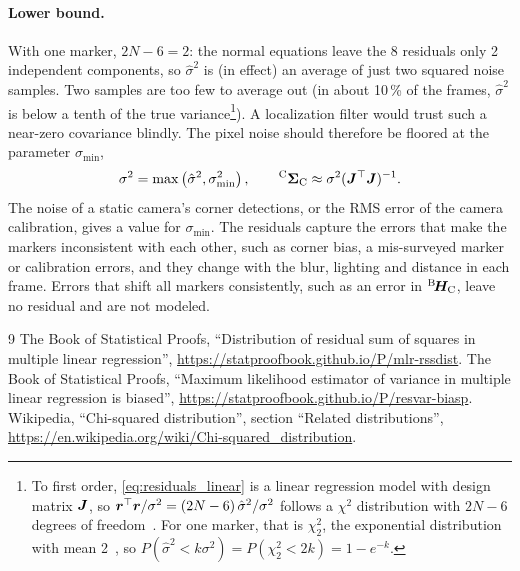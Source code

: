 \documentclass{article}
\begin{document}
\paragraph{Lower bound.}
With one marker, $2N - 6 = 2$: the normal equations leave the 8 residuals only 2 independent components, so $\hat\sigma^2$ is (in effect) an average of just two squared noise samples. Two samples are too few to average out (in about 10\,\% of the frames, $\hat\sigma^2$ is below a tenth of the true variance\footnote{To first order, \eqref{eq:residuals_linear} is a linear regression model with design matrix $\bm{J}$, so $\bm{r}^\top \bm{r} / \sigma^2 = (2N - 6)\,\hat\sigma^2 / \sigma^2$ follows a $\chi^2$ distribution with $2N - 6$ degrees of freedom~\cite{statproofbook_rssdist}. For one marker, that is $\chi^2_2$, the exponential distribution with mean 2~\cite{wikipedia_chi2}, so $P(\hat\sigma^2 < k \sigma^2) = P(\chi^2_2 < 2k) = 1 - e^{-k}$.}). A localization filter would trust such a near-zero covariance blindly. The pixel noise should therefore be floored at the parameter $\sigma_\mathrm{min}$,
\[
  \sigma^2 = \max\left(\hat\sigma^2, \sigma_\mathrm{min}^2\right),
  \qquad
  {}^{\mathrm{C}} \bm{\Sigma}_{\mathrm{C}} \approx \sigma^2 (\bm{J}^\top \bm{J})^{-1}.
\]
The noise of a static camera's corner detections, or the RMS error of the camera calibration, gives a value for $\sigma_\mathrm{min}$.
The residuals capture the errors that make the markers inconsistent with each other, such as corner bias, a mis-surveyed marker or calibration errors, and they change with the blur, lighting and distance in each frame. Errors that shift all markers consistently, such as an error in ${}^{\mathrm{B}}\! \bm{H}_{\mathrm{C}}$, leave no residual and are not modeled.

\begin{thebibliography}{9}
  The Book of Statistical Proofs, ``Distribution of residual sum of squares in multiple linear regression'', \url{https://statproofbook.github.io/P/mlr-rssdist}.
  The Book of Statistical Proofs, ``Maximum likelihood estimator of variance in multiple linear regression is biased'', \url{https://statproofbook.github.io/P/resvar-biasp}.
  Wikipedia, ``Chi-squared distribution'', section ``Related distributions'', \url{https://en.wikipedia.org/wiki/Chi-squared_distribution}.
\end{thebibliography}
\end{document}
